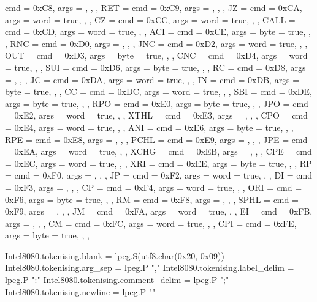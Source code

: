 {{        { cmd = 0xC8, args = {}, },
    },
    RET  = {
        { cmd = 0xC9, args = {}, },
    },
    JZ   = {
        { cmd = 0xCA, args = {{word = true}}, },
    },
    CZ   = {
        { cmd = 0xCC, args = {{word = true}}, },
    },
    CALL = {
        { cmd = 0xCD, args = {{word = true}}, },
    },
    ACI  = {
        { cmd = 0xCE, args = {{byte = true}}, },
    },
    RNC  = {
        { cmd = 0xD0, args = {}, },
    },
    JNC  = {
        { cmd = 0xD2, args = {{word = true}}, },
    },
    OUT  = {
        { cmd = 0xD3, args = {{byte = true}}, },
    },
    CNC  = {
        { cmd = 0xD4, args = {{word = true}}, },
    },
    SUI  = {
        { cmd = 0xD6, args = {{byte = true}}, },
    },
    RC   = {
        { cmd = 0xD8, args = {}, },
    },
    JC   = {
        { cmd = 0xDA, args = {{word = true}}, },
    },
    IN   = {
        { cmd = 0xDB, args = {{byte = true}}, },
    },
    CC   = {
        { cmd = 0xDC, args = {{word = true}}, },
    },
    SBI  = {
        { cmd = 0xDE, args = {{byte = true}}, },
    },
    RPO  = {
        { cmd = 0xE0, args = {{byte = true}}, },
    },
    JPO  = {
        { cmd = 0xE2, args = {{word = true}}, },
    },
    XTHL = {
        { cmd = 0xE3, args = {}, },
    },
    CPO  = {
        { cmd = 0xE4, args = {{word = true}}, },
    },
    ANI  = {
        { cmd = 0xE6, args = {{byte = true}}, },
    },
    RPE  = {
        { cmd = 0xE8, args = {}, },
    },
    PCHL = {
        { cmd = 0xE9, args = {}, },
    },
    JPE  = {
        { cmd = 0xEA, args = {{word = true}}, },
    },
    XCHG = {
        { cmd = 0xEB, args = {}, },
    },
    CPE  = {
        { cmd = 0xEC, args = {{word = true}}, },
    },
    XRI  = {
        { cmd = 0xEE, args = {{byte = true}}, },
    },
    RP   = {
        { cmd = 0xF0, args = {}, },
    },
    JP   = {
        { cmd = 0xF2, args = {{word = true}}, },
    },
    DI   = {
        { cmd = 0xF3, args = {}, },
    },
    CP   = {
        { cmd = 0xF4, args = {{word = true}}, },
    },
    ORI  = {
        { cmd = 0xF6, args = {{byte = true}}, },
    },
    RM   = {
        { cmd = 0xF8, args = {}, },
    },
    SPHL = {
        { cmd = 0xF9, args = {}, },
    },
    JM   = {
        { cmd = 0xFA, args = {{word = true}}, },
    },
    EI   = {
        { cmd = 0xFB, args = {}, },
    },
    CM   = {
        { cmd = 0xFC, args = {{word = true}}, },
    },
    CPI  = {
        { cmd = 0xFE, args = {{byte = true}}, },
    },
}

Intel8080.tokenising.blank = lpeg.S(utf8.char(0x20, 0x09))
Intel8080.tokenising.arg_sep = lpeg.P ","
Intel8080.tokenising.label_delim = lpeg.P ":"
Intel8080.tokenising.comment_delim = lpeg.P ";"
Intel8080.tokenising.newline = lpeg.P "\n"

